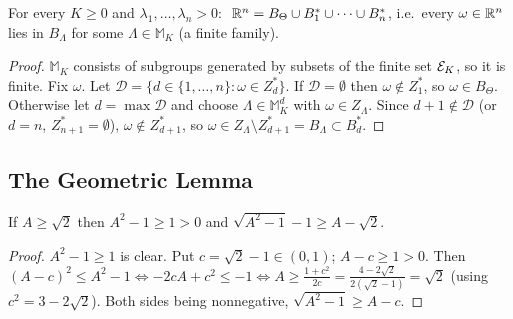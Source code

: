 \begin{proposition}\label{bpN:p8:blocks-cover}
For every $K\ge0$ and $\lambda_1,\dots,\lambda_n>0$: $\ \mathbb{R}^n=B_\Theta\cup B_1^*\cup\dots\cup B_n^*$, i.e.\ every $\omega\in\mathbb{R}^n$ lies in $B_\Lambda$ for some $\Lambda\in\mathbb M_K$ (a finite family).
\end{proposition}
\begin{proof}
\label{stepN:p8:bc-finite} $\mathbb M_K$ consists of subgroups generated by subsets of the finite set $\mathcal E_K$, so it is finite.
\label{stepN:p8:bc-top} Fix $\omega$. Let $\mathcal D=\{d\in\{1,\dots,n\}:\omega\in Z_d^*\}$. If $\mathcal D=\emptyset$ then $\omega\notin Z_1^*$, so $\omega\in B_\Theta$. Otherwise let $d=\max\mathcal D$ and choose $\Lambda\in\mathbb M_K^d$ with $\omega\in Z_\Lambda$. Since $d+1\notin\mathcal D$ (or $d=n$, $Z_{n+1}^*=\emptyset$), $\omega\notin Z^*_{d+1}$, so $\omega\in Z_\Lambda\setminus Z^*_{d+1}=B_\Lambda\subset B^*_d$.
\end{proof}

\subsection{The Geometric Lemma}\label{bpN:p8:s-geometric}

\begin{lemma}\label{bpN:p8:sqrt}
If $A\ge\sqrt2$ then $A^2-1\ge1>0$ and $\sqrt{A^2-1}-1\ge A-\sqrt2$.
\end{lemma}
\begin{proof}
$A^2-1\ge1$ is clear. Put $c=\sqrt2-1\in(0,1)$; $A-c\ge1>0$. Then $(A-c)^2\le A^2-1\iff-2cA+c^2\le-1\iff A\ge\frac{1+c^2}{2c}=\frac{4-2\sqrt2}{2(\sqrt2-1)}=\sqrt2$ (using $c^2=3-2\sqrt2$). Both sides being nonnegative, $\sqrt{A^2-1}\ge A-c$.
\end{proof}


